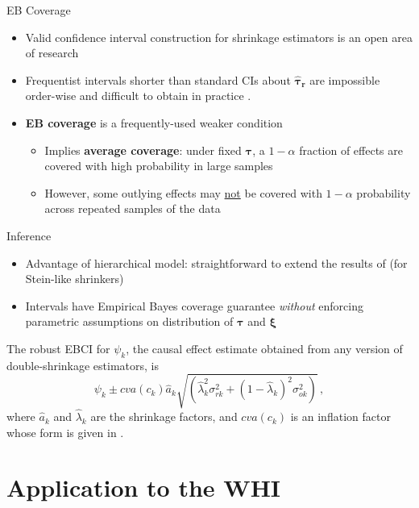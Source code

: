 \documentclass[usenames,dvipsnames]{beamer}
\newcommand{\bstau}{\boldsymbol{\tau}}
\newcommand{\taur}{\boldsymbol{\hat \tau_r}}
\newcommand{\bsxi}{\boldsymbol{\xi}}
\let\oldcite=\cite
\let\oldcitep=\citep
\renewcommand{\cite}[1]{\textcolor[rgb]{.3,.3,.8}{\oldcite{#1}}}
\renewcommand{\citep}[1]{\textcolor[rgb]{.3,.3,.8}{\oldcitep{#1}}}
\theoremstyle{definition} %
\begin{document}
\begin{frame}{EB Coverage}
\begin{itemize}
\item Valid confidence interval construction for shrinkage estimators is an open area of research \citep{hoff2019exact} \pause
\item Frequentist intervals shorter than standard CIs about $\taur$ are impossible order-wise and difficult to obtain in practice \citep{chen2021minimax}. \pause
\item \textbf{EB coverage} is a frequently-used weaker condition 
\begin{itemize}
\item Implies \textbf{average coverage}: under fixed $\bstau$, a $1 - \alpha$ fraction of effects are covered with high probability in large samples
\item However, some outlying effects may \underline{not} be covered with $1 - \alpha$ probability across repeated samples of the data 
\end{itemize}
\end{itemize}
\end{frame}

\begin{frame}{Inference}
\begin{itemize}
\item Advantage of hierarchical model: straightforward to extend the results of \cite{armstrong2020robust} (for Stein-like shrinkers) 
\item Intervals have Empirical Bayes coverage guarantee \emph{without} enforcing parametric assumptions on distribution of $\bstau$ and $\bsxi$ 
\end{itemize} \pause

\begin{definition}\label{def:cis}
The robust EBCI for $\psi_k$, the causal effect estimate obtained from any version of double-shrinkage estimators, is 
\[ \psi_k \pm cva(c_k) \hat a_k\sqrt{ \left( \hat \lambda_k^2 \sigma_{rk}^2 + (1 - \hat \lambda_k)^2 \sigma_{ok}^2 \right)}\,, \] 
where $\hat a_k$ and $\hat \lambda_k$ are the shrinkage factors, and $cva(c_k)$ is an inflation factor whose form is given in  \cite{armstrong2020robust}. 
\end{definition}

\end{frame}



\section{Application to the WHI}
\end{document}

